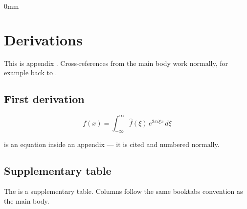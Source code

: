 \begin{adjustwidth}{\appendixtab}{0mm}
\section{Derivations} \label{app:derivations}

This is appendix . Cross-references from the
main body work normally, for example back to .

\lipsum[1]

\subsection{First derivation} \label{app:derivations:sub1}

\lipsum[1]

\begin{equation}
    \label{eq:app:example}
    f(x) = \int_{-\infty}^{\infty} \hat{f}(\xi)\, e^{2\pi i \xi x}\, d\xi
\end{equation}

 is an equation inside an appendix --- it is
cited and numbered normally.

\subsection{Supplementary table} \label{app:derivations:tbl}

The  is a supplementary table. Columns
follow the same booktabs convention as the main body.

\lipsum[1]


\end{adjustwidth}
